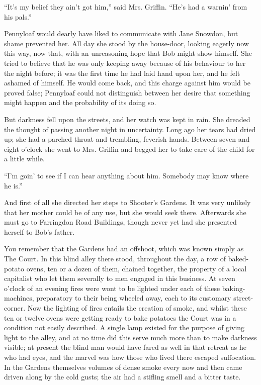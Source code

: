 ``It's my belief they ain't got him,'' said Mrs. Griffin. ``He's had a
warnin' from his pals.''

Pennyloaf would dearly have liked to communicate with Jane Snowdon, but
shame prevented her. All day she stood by the house-door, looking
eagerly now this way, now that, with an unreasoning hope that Bob might
show himself. She tried to believe that he was only keeping away because
of his behaviour to her the night before; it was the first time he had
laid hand upon her, and he felt ashamed of himself. He would come back,
and this charge against him would be proved false; Pennyloaf could not
distinguish between her desire that something might happen and the
probability of its doing so.

But darkness fell upon the streets, and her
{\protect\hypertarget{209}{}{}}watch was kept in rain. She dreaded the
thought of passing another night in uncertainty. Long ago her tears had
dried up; she had a parched throat and trembling, feverish hands.
Between seven and eight o'clock she went to Mrs. Griffin and begged her
to take care of the child for a little while.

``I'm goin' to see if I can hear anything about him. Somebody may know
where he is.''

And first of all she directed her steps to Shooter's Gardens. It was
very unlikely that her mother could be of any use, but she would seek
there. Afterwards she must go to Farringdon Road Buildings, though never
yet had she presented herself to Bob's father.

You remember that the Gardens had an offshoot, which was known simply as
The Court. In this blind alley there stood, throughout the day, a row of
baked-potato ovens, ten or a dozen of them, chained together, the
property of a local capitalist who let them severally to men engaged in
this business. At seven o'clock of an evening fires were wont to be
lighted under each of these baking-machines, preparatory to their being
wheeled away, each to its customary
{\protect\hypertarget{210}{}{}}street-corner. Now the lighting of fires
entails the creation of smoke, and whilst these ten or twelve ovens were
getting ready to bake potatoes the Court was in a condition not easily
described. A single lamp existed for the purpose of giving light to the
alley, and at no time did this serve much more than to make darkness
visible; at present the blind man would have fared as well in that
retreat as he who had eyes, and the marvel was how those who lived there
escaped suffocation. In the Gardens themselves volumes of dense smoke
every now and then came driven along by the cold gusts; the air had a
stifling smell and a bitter taste.

